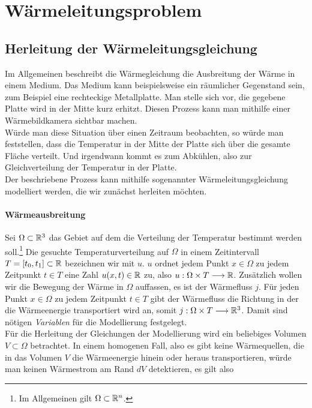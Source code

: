 \chapter{Wärmeleitungsproblem}
\label{cha:2}

\section{Herleitung der Wärmeleitungsgleichung}

Im Allgemeinen beschreibt die Wärmegleichung die Ausbreitung der Wärme in einem Medium. Das Medium kann beispielsweise ein räumlicher Gegenstand sein, zum Beispiel eine rechteckige Metallplatte. Man stelle sich vor, die gegebene Platte wird in der Mitte kurz erhitzt. Diesen Prozess kann man mithilfe einer Wärmebildkamera sichtbar machen.\\

Würde man diese Situation über einen Zeitraum beobachten, so würde man feststellen, dass die Temperatur in der Mitte der Platte sich über die gesamte Fläche verteilt. Und irgendwann kommt es zum Abkühlen, also zur Gleichverteilung der Temperatur in der Platte.\\

Der beschriebene Prozess kann mithilfe sogenannter Wärmeleitungsgleichung modelliert werden, die wir zunächst herleiten möchten.

\subsubsection*{Wärmeausbreitung}
Sei $\Omega \subset \mathbb{R}^{3}$ das Gebiet auf dem die Verteilung der Temperatur bestimmt werden soll.\footnote{\label{foot:1.2.1} Im Allgemeinen gilt $\Omega \subset \mathbb{R}^n$.} Die gesuchte Temperaturverteilung auf $\Omega$ in einem Zeitintervall $T = [t_0, t_1] \subset \mathbb{R}$ bezeichnen wir mit $u$. $u$ ordnet jedem Punkt $x \in \Omega$ zu jedem Zeitpunkt $t \in T$ eine Zahl $u(x, t) \in \mathbb{R}$ zu, also $u:\Omega \times T \longrightarrow \mathbb{R}$. Zusätzlich wollen wir die Bewegung der Wärme in $\Omega$ auffassen, es ist der Wärmefluss $j$. Für jeden Punkt $x \in \Omega$ zu jedem Zeitpunkt $t \in T$ gibt der Wärmefluss die Richtung in der die Wärmeenergie transportiert wird an, somit $j:\Omega \times T \longrightarrow \mathbb{R}^3$. Damit sind nötigen \textit{Variablen} für die Modellierung festgelegt.\\

Für die Herleitung der Gleichungen der Modellierung wird ein beliebiges Volumen $V \subset \Omega$ betrachtet. In einem homogenen Fall, also es gibt keine Wärmequellen, die in das Volumen $V$ die Wärmeenergie hinein oder heraus transportieren, würde man keinen Wärmestrom am Rand $dV$ detektieren, es gilt also

